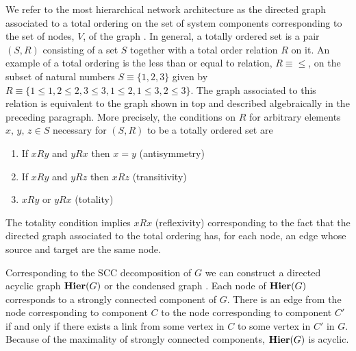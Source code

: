  We refer to the most hierarchical network architecture as the directed graph associated to a total ordering on the set of system components corresponding to the set of nodes, $V$, of the graph \cite{Cormen2009}. In general, a totally ordered set is a pair $(S,R)$ consisting of a set $S$ together with a total order relation $R$ on it. An example of a total ordering is the less than or equal to relation, $R \equiv \leq$, on the subset of natural numbers $S \equiv \{1,2,3\}$ given by $R \equiv \{1 \leq 1, 2 \leq 2, 3 \leq 3, 1 \leq 2, 1 \leq 3, 2 \leq 3\}$. The graph associated to this relation is equivalent to the graph shown in  top and described algebraically in the preceding paragraph. More precisely, the conditions on $R$ for arbitrary elements $x,\,y,\,z \in S$ necessary for $(S,R)$ to be a totally ordered set are
\begin{enumerate}
\item If $x R y$ and $y R x$ then $x=y$ (antisymmetry)
\item If $x R y$ and $y R z$ then $x R z$ (transitivity)
\item $x R y$ or $y R x$ (totality)
\end{enumerate}
The totality condition implies $x R x$ (reflexivity) corresponding to the fact that the directed graph associated to the total ordering has, for each node, an edge whose source and target are the same node.

Corresponding to the SCC decomposition of $G$ we can construct a directed acyclic graph $\mathbf{Hier} (G)$ or the condensed graph \cite{Corominas-Murtra2013}.  Each node of $\mathbf{Hier} (G)$ corresponds to a strongly connected component of $G$. There is an edge from the node corresponding to component $C$ to the node corresponding to component $C'$ if and only if there exists a link from some vertex in $C$ to some vertex in $C'$ in $G$.  Because of the maximality of strongly connected components, $\mathbf{Hier} (G)$ is acyclic.


